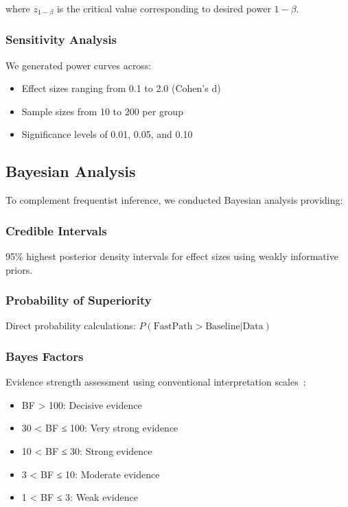 \documentclass[conference]{IEEEtran}
\begin{document}
where $z_{1-\beta}$ is the critical value corresponding to desired power $1-\beta$.

\subsubsection{Sensitivity Analysis}
We generated power curves across:
\begin{itemize}
    \item Effect sizes ranging from 0.1 to 2.0 (Cohen's d)
    \item Sample sizes from 10 to 200 per group
    \item Significance levels of 0.01, 0.05, and 0.10
\end{itemize}

\subsection{Bayesian Analysis}
\label{subsec:bayesian}

To complement frequentist inference, we conducted Bayesian analysis providing:

\subsubsection{Credible Intervals}
95\% highest posterior density intervals for effect sizes using weakly informative priors.

\subsubsection{Probability of Superiority}
Direct probability calculations: $P(\text{FastPath} > \text{Baseline} | \text{Data})$

\subsubsection{Bayes Factors}
Evidence strength assessment using conventional interpretation scales~\cite{kass1995bayes}:
\begin{itemize}
    \item BF > 100: Decisive evidence
    \item 30 < BF ≤ 100: Very strong evidence
    \item 10 < BF ≤ 30: Strong evidence  
    \item 3 < BF ≤ 10: Moderate evidence
    \item 1 < BF ≤ 3: Weak evidence
\end{itemize}
\end{document}
